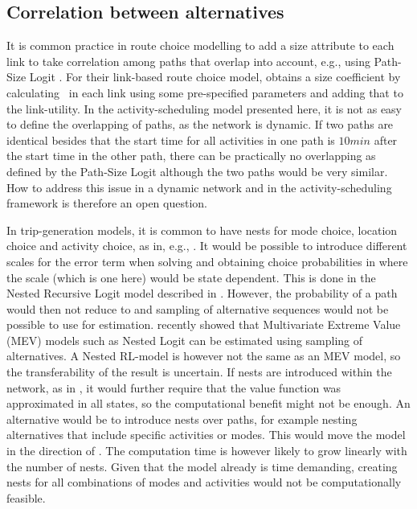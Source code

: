 \subsection{Correlation between alternatives}
It is common practice in route choice modelling to add a size attribute to each link to take correlation among paths that overlap into account, e.g., using Path-Size Logit \citep{BenAkivaBier99}. For their link-based route choice model, \citet{fosgerau11} obtains a size coefficient by calculating \eutil\, in each link using some pre-specified parameters and adding that to the link-utility. In the activity-scheduling model presented here, it is not as easy to define the overlapping of paths, as the network is dynamic. If two paths are identical besides that the start time for all activities in one path is $10\unit{min}$ after the start time in the other path, there can be practically no overlapping as defined by the Path-Size Logit although the two paths would be very similar. How to address this issue in a dynamic network and in the activity-scheduling framework is therefore an open question.

In trip-generation models, it is common to have nests for mode choice, location choice and activity choice, as in, e.g., \citet{Bowman01}. It would be possible to introduce different scales for the error term when solving  and obtaining choice probabilities in  where the scale (which is one here) would be state dependent. This is done in the Nested Recursive Logit model described in \citet{mai2015}. However, the probability of a path would then not reduce to   and sampling of alternative sequences would not be possible to use for estimation.
\citet{guevara2013MEV} recently showed that Multivariate Extreme Value (MEV) models such as Nested Logit can be estimated using sampling of alternatives. A Nested RL-model is however not the same as an MEV model, so the transferability of the result is uncertain. If nests are introduced within the network, as in \citet{mai2015}, it would further require that the value function was approximated in all states, so the computational benefit might not be enough. An alternative would be to introduce nests over paths, for example nesting alternatives that include specific activities or modes. This would move the model in the direction of \citet{Bowman01}. The computation time is however likely to grow linearly with the number of nests. Given that the model already is time demanding, creating nests for all combinations of modes and activities would not be computationally feasible.

